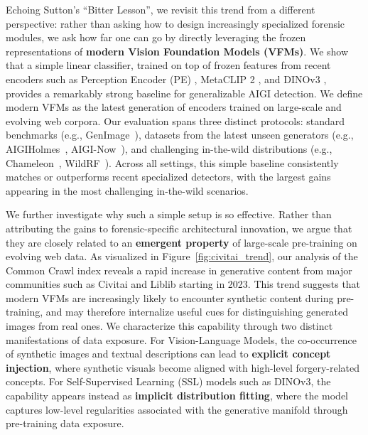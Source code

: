 \documentclass[sigconf,screen]{acmart}
\theoremstyle{plain}
\theoremstyle{definition}
\theoremstyle{remark}
\begin{document}
Echoing Sutton's ``Bitter Lesson'', we revisit this trend from a different perspective: rather than asking how to design increasingly specialized forensic modules, we ask how far one can go by directly leveraging the frozen representations of \textbf{modern Vision Foundation Models (VFMs)}. We show that a simple linear classifier, trained on top of frozen features from recent encoders such as Perception Encoder (PE) \cite{bolya2025perception}, MetaCLIP 2 \cite{chuang2025metaclip}, and DINOv3 \cite{simeoni2025dinov3}, provides a remarkably strong baseline for generalizable AIGI detection. We define modern VFMs as the latest generation of encoders trained on large-scale and evolving web corpora. Our evaluation spans three distinct protocols: standard benchmarks (e.g., GenImage~\cite{zhu2023genimage}), datasets from the latest unseen generators (e.g., AIGIHolmes~\cite{zhou2025aigi}, AIGI-Now~\cite{chen2025task}), and challenging in-the-wild distributions (e.g., Chameleon~\cite{yan2024sanity}, WildRF~\cite{cavia2024real}). Across all settings, this simple baseline consistently matches or outperforms recent specialized detectors, with the largest gains appearing in the most challenging in-the-wild scenarios.

We further investigate why such a simple setup is so effective. Rather than attributing the gains to forensic-specific architectural innovation, we argue that they are closely related to an \textbf{emergent property} of large-scale pre-training on evolving web data. As visualized in Figure~\ref{fig:civitai_trend}, our analysis of the Common Crawl index reveals a rapid increase in generative content from major communities such as Civitai and Liblib starting in 2023. This trend suggests that modern VFMs are increasingly likely to encounter synthetic content during pre-training, and may therefore internalize useful cues for distinguishing generated images from real ones. We characterize this capability through two distinct manifestations of data exposure. For Vision-Language Models, the co-occurrence of synthetic images and textual descriptions can lead to \textbf{explicit concept injection}, where synthetic visuals become aligned with high-level forgery-related concepts. For Self-Supervised Learning (SSL) models such as DINOv3, the capability appears instead as \textbf{implicit distribution fitting}, where the model captures low-level regularities associated with the generative manifold through pre-training data exposure.
\end{document}
